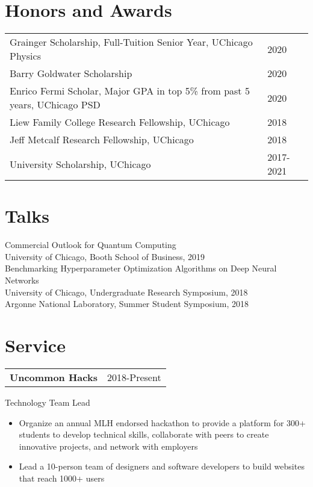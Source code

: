 \documentclass[letterpaper, 12pt]{article}
\begin{document}
\section{Honors and Awards}
\begin{tabular}{@{} L{14.5cm} @{} R{2.01cm} @{}}
  Grainger Scholarship, Full-Tuition Senior Year, UChicago Physics & 2020\\
  Barry Goldwater Scholarship & 2020\\
  Enrico Fermi Scholar, Major GPA in top 5\% from past 5 years, UChicago PSD & 2020\\
  Liew Family College Research Fellowship, UChicago & 2018\\
  Jeff Metcalf Research Fellowship, UChicago & 2018 \\
  University Scholarship, UChicago & 2017-2021\\
\end{tabular}

\section{Talks}
Commercial Outlook for Quantum Computing\\
\qquad University of Chicago, Booth School of Business, 2019\\
Benchmarking Hyperparameter Optimization Algorithms on Deep Neural Networks\\
\qquad University of Chicago, Undergraduate Research Symposium, 2018\\
\qquad Argonne National Laboratory, Summer Student Symposium, 2018\\


\section{Service}
\begin{tabular}{@{} L{12cm} @{} R{4.51cm} @{}}
  \textbf{Uncommon Hacks} & 2018-Present\\
\end{tabular}
Technology Team Lead\\
\begin{itemize}
\item Organize an annual MLH endorsed hackathon to provide a platform for 300+
  students to develop technical skills,
  collaborate with peers to create innovative projects, and network with employers
\item Lead a 10-person team of designers and software developers
  to build websites that reach 1000+ users
\end{itemize}
\end{document}
